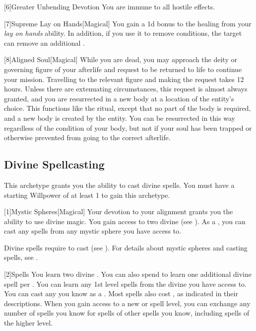         [6]{Greater Unbending Devotion}
        You are immune to all hostile  effects.

        [7]{Supreme Lay on Hands}[Magical]
        You gain a \plus1d bonus to the healing from your \textit{lay on hands} ability.
        In addition, if you use it to remove conditions, the target can remove an additional .

        [8]{Aligned Soul}[Magical]
        While you are dead, you may approach the deity or governing figure of your afterlife and request to be returned to life to continue your mission.
        Travelling to the relevant figure and making the request takes 12 hours.
        Unless there are extenuating circumstances, this request is almost always granted, and you are resurrected in a new body at a location of the entity's choice.
        This functions like the  ritual, except that no part of the body is required, and a new body is created by the entity.
        You can be resurrected in this way regardless of the condition of your body, but not if your soul has been trapped or otherwise prevented from going to the correct afterlife.

    \subsection{Divine Spellcasting}
        This archetype grants you the ability to cast divine spells.
        You must have a starting Willpower of at least 1 to gain this archetype.

        [1]{Mystic Spheres}[Magical]
        Your devotion to your alignment grants you the ability to use divine magic.
        You gain access to two divine  (see ).
        As a , you can cast any  spells from any mystic sphere you have access to.

        Divine spells require  to cast (see ).
        For details about mystic spheres and casting spells, see .

        [2]{Spells} You learn two divine .
        You can also spend  to learn one additional divine spell per .
        You can learn any 1st level spells from the divine  you have access to.
        You can cast any  you know as a .
        Most spells also cost , as indicated in their descriptions.
        When you gain access to a new  or spell level, you can exchange any number of spells you know for spells of other spells you know, including spells of the higher level.

